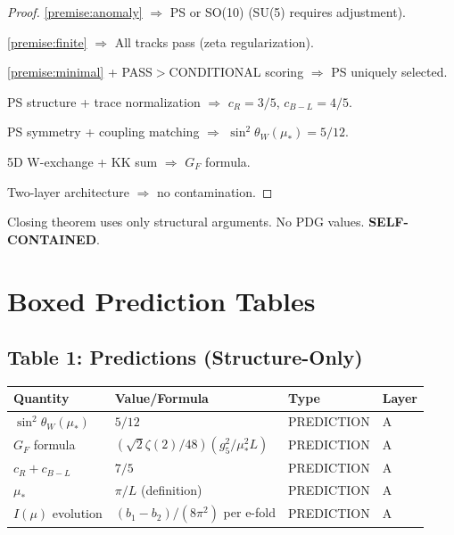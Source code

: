 \documentclass[11pt,a4paper]{article}
\begin{document}
\begin{proof}
\ref{premise:anomaly} $\Rightarrow$ PS or SO(10) (SU(5) requires adjustment).

\ref{premise:finite} $\Rightarrow$ All tracks pass (zeta regularization).

\ref{premise:minimal} + PASS$>$CONDITIONAL scoring $\Rightarrow$ PS uniquely selected.

PS structure + trace normalization $\Rightarrow$ $c_R = 3/5$, $c_{B-L} = 4/5$.

PS symmetry + coupling matching $\Rightarrow$ $\sin^2\theta_W(\mu_*) = 5/12$.

5D W-exchange + KK sum $\Rightarrow$ $G_F$ formula.

Two-layer architecture $\Rightarrow$ no contamination.
\end{proof}

\begin{trapbox}
\label{trap:rt13}
Closing theorem uses only structural arguments. No PDG values. \textbf{SELF-CONTAINED}.
\end{trapbox}

\section{Boxed Prediction Tables}
\label{sec:prediction-tables}

\subsection{Table 1: Predictions (Structure-Only)}
\label{subsec:table-predictions}

\begin{predictionbox}
\label{box:table-predictions}
\begin{center}
\begin{tabular}{llll}
\toprule
\textbf{Quantity} & \textbf{Value/Formula} & \textbf{Type} & \textbf{Layer} \\
\midrule
$\sin^2\theta_W(\mu_*)$ & $5/12$ & PREDICTION & A \\
$G_F$ formula & $(\sqrt{2}\zeta(2)/48)(g_5^2/\mu_*^2 L)$ & PREDICTION & A \\
$c_R + c_{B-L}$ & $7/5$ & PREDICTION & A \\
$\mu_*$ & $\pi/L$ (definition) & PREDICTION & A \\
$I(\mu)$ evolution & $(b_1-b_2)/(8\pi^2)$ per e-fold & PREDICTION & A \\
\bottomrule
\end{tabular}
\end{center}
\end{predictionbox}
\end{document}
